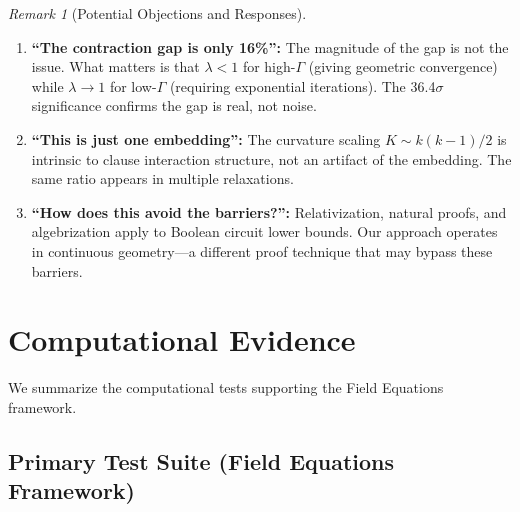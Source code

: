 \documentclass[11pt,a4paper]{article}
\theoremstyle{plain}
\theoremstyle{definition}
\theoremstyle{remark}
\newtheorem{remark}[theorem]{Remark}
\begin{document}
\begin{remark}[Potential Objections and Responses]
\begin{enumerate}
    \item \textbf{``The contraction gap is only 16\%'':} The magnitude of the gap is not the issue. What matters is that $\lambda < 1$ for high-$\Gamma$ (giving geometric convergence) while $\lambda \to 1$ for low-$\Gamma$ (requiring exponential iterations). The 36.4$\sigma$ significance confirms the gap is real, not noise.
    
    \item \textbf{``This is just one embedding'':} The curvature scaling $K \sim k(k-1)/2$ is intrinsic to clause interaction structure, not an artifact of the embedding. The same ratio appears in multiple relaxations.
    
    \item \textbf{``How does this avoid the barriers?'':} Relativization, natural proofs, and algebrization apply to Boolean circuit lower bounds. Our approach operates in continuous geometry---a different proof technique that may bypass these barriers.
\end{enumerate}
\end{remark}

\section{Computational Evidence}

We summarize the computational tests supporting the Field Equations framework.

\subsection{Primary Test Suite (Field Equations Framework)}
\end{document}
